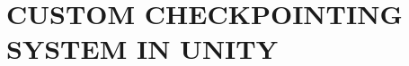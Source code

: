 \chapter{CUSTOM CHECKPOINTING SYSTEM IN UNITY}
\inputminted[linenos,tabsize=2,breaklines]{csharp}{clean_code_fucnt.cs}
